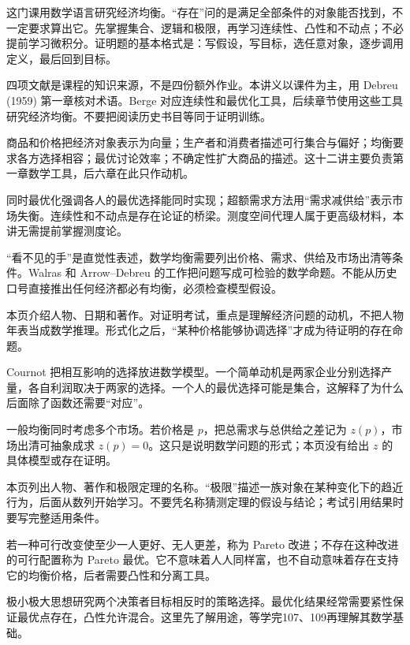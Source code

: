 
这门课用数学语言研究经济均衡。“存在”问的是满足全部条件的对象能否找到，不一定要求算出它。先掌握集合、逻辑和极限，再学习连续性、凸性和不动点；不必提前学习微积分。证明题的基本格式是：写假设，写目标，选任意对象，逐步调用定义，最后回到目标。

四项文献是课程的知识来源，不是四份额外作业。本讲义以课件为主，用 Debreu (1959) 第一章核对术语。Berge 对应连续性和最优化工具，后续章节使用这些工具研究经济均衡。不要把阅读历史书目等同于证明训练。

商品和价格把经济对象表示为向量；生产者和消费者描述可行集合与偏好；均衡要求各方选择相容；最优讨论效率；不确定性扩大商品的描述。这十二讲主要负责第一章数学工具，后六章在此只作动机。

同时最优化强调各人的最优选择能同时实现；超额需求方法用“需求减供给”表示市场失衡。连续性和不动点是存在论证的桥梁。测度空间代理人属于更高级材料，本讲无需提前掌握测度论。

“看不见的手”是直觉性表述，数学均衡需要列出价格、需求、供给及市场出清等条件。Walras 和 Arrow--Debreu 的工作把问题写成可检验的数学命题。不能从历史口号直接推出任何经济都必有均衡，必须检查模型假设。

本页介绍人物、日期和著作。对证明考试，重点是理解经济问题的动机，不把人物年表当成数学推理。形式化之后，“某种价格能够协调选择”才成为待证明的存在命题。

Cournot 把相互影响的选择放进数学模型。一个简单动机是两家企业分别选择产量，各自利润取决于两家的选择。一个人的最优选择可能是集合，这解释了为什么后面除了函数还需要“对应”。

一般均衡同时考虑多个市场。若价格是 $p$，把总需求与总供给之差记为 $z(p)$，市场出清可抽象成求 $z(p)=0$。这只是说明数学问题的形式；本页没有给出 $z$ 的具体模型或存在证明。

本页列出人物、著作和极限定理的名称。“极限”描述一族对象在某种变化下的趋近行为，后面从数列开始学习。不要凭名称猜测定理的假设与结论；考试引用结果时要写完整适用条件。

若一种可行改变使至少一人更好、无人更差，称为 Pareto 改进；不存在这种改进的可行配置称为 Pareto 最优。它不意味着人人同样富，也不自动意味着存在支持它的均衡价格，后者需要凸性和分离工具。

极小极大思想研究两个决策者目标相反时的策略选择。最优化结果经常需要紧性保证最优点存在，凸性允许混合。这里先了解用途，等学完107、109再理解其数学基础。

